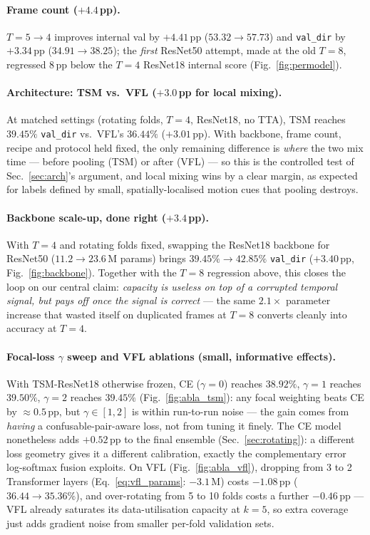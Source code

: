 \documentclass[10pt,twocolumn,letterpaper]{article}
\begin{document}
\paragraph{Frame count ($+4.4$\,pp).}
$T{=}5\!\rightarrow\!4$ improves internal val by $+4.41$\,pp
($53.32\!\rightarrow\!57.73$) and \texttt{val\_dir} by $+3.34$\,pp
($34.91\!\rightarrow\!38.25$); the \emph{first} ResNet50 attempt, made at the
old $T{=}8$, regressed $8$\,pp below the $T{=}4$ ResNet18 internal score
(Fig.~\ref{fig:permodel}).

\paragraph{Architecture: TSM vs.\ VFL ($+3.0$\,pp for local mixing).}
At matched settings (rotating folds, $T{=}4$, ResNet18, no TTA), TSM reaches
$39.45\%$ \texttt{val\_dir} vs.\ VFL's $36.44\%$ ($+3.01$\,pp). With backbone,
frame count, recipe and protocol held fixed, the only remaining difference is
\emph{where} the two mix time --- before pooling (TSM) or after (VFL) --- so
this is the controlled test of Sec.~\ref{sec:arch}'s argument, and local
mixing wins by a clear margin, as expected for labels defined by small,
spatially-localised motion cues that pooling destroys.

\paragraph{Backbone scale-up, done right ($+3.4$\,pp).}
With $T{=}4$ and rotating folds fixed, swapping the ResNet18 backbone for
ResNet50 ($11.2\!\rightarrow\!23.6$\,M params) brings
$39.45\%\!\rightarrow\!42.85\%$ \texttt{val\_dir} ($+3.40$\,pp,
Fig.~\ref{fig:backbone}). Together with the $T{=}8$ regression above, this
closes the loop on our central claim: \emph{capacity is useless on top of a
corrupted temporal signal, but pays off once the signal is correct} --- the
same $2.1\times$ parameter increase that wasted itself on duplicated frames at
$T{=}8$ converts cleanly into accuracy at $T{=}4$.

\paragraph{Focal-loss $\gamma$ sweep and VFL ablations (small, informative effects).}
With TSM-ResNet18 otherwise frozen, CE ($\gamma{=}0$) reaches $38.92\%$,
$\gamma{=}1$ reaches $39.50\%$, $\gamma{=}2$ reaches $39.45\%$
(Fig.~\ref{fig:abla_tsm}): any focal weighting beats CE by
${\approx}0.5$\,pp, but $\gamma{\in}[1,2]$ is within run-to-run noise --- the
gain comes from \emph{having} a confusable-pair-aware loss, not from tuning it
finely. The CE model nonetheless adds $+0.52$\,pp to the final ensemble
(Sec.~\ref{sec:rotating}): a different loss geometry gives it a different
calibration, exactly the complementary error log-softmax fusion exploits. On
VFL (Fig.~\ref{fig:abla_vfl}), dropping from 3 to 2 Transformer layers
(Eq.~\eqref{eq:vfl_params}: $-3.1$\,M) costs $-1.08$\,pp
($36.44\!\rightarrow\!35.36\%$), and over-rotating from 5 to 10 folds costs a
further $-0.46$\,pp --- VFL already saturates its data-utilisation capacity at
$k{=}5$, so extra coverage just adds gradient noise from smaller per-fold
validation sets.
\end{document}
